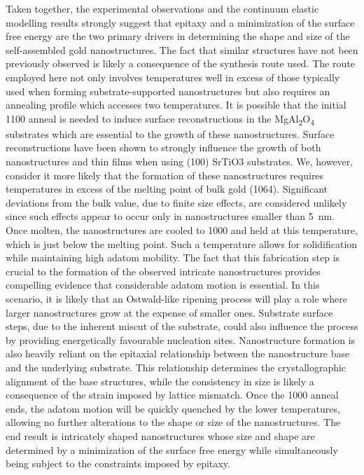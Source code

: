 Taken together, the experimental observations and the continuum elastic modelling results strongly suggest that epitaxy and a minimization of the surface free energy are the two primary drivers in determining the shape and size of the self-assembled gold nanostructures.
The fact that similar structures have not been previously observed is likely a consequence of the synthesis route used.
The route employed here not only involves temperatures well in excess of those typically used when forming substrate-supported nanostructures but also requires an annealing profile which accesses two temperatures.
It is possible that the initial 1100\celsius{} anneal is needed to induce surface reconstructions in the MgAl\textsubscript{2}O\textsubscript{4} substrates which are essential to the growth of these nanostructures.
Surface reconstructions have been shown to strongly influence the growth of both nanostructures\cite{RefWorks:24,RefWorks:16,RefWorks:104} and thin films\cite{Neretina2009a} when using (100) SrTiO3 substrates.
We, however, consider it more likely that the formation of these nanostructures requires temperatures in excess of the melting point of bulk gold (1064\celsius{}).
Significant deviations from the bulk value, due to finite size effects, are considered unlikely since such effects appear to occur only in nanostructures smaller than 5~nm\cite{RefWorks:43}.
Once molten, the nanostructures are cooled to 1000\celsius{} and held at this temperature, which is just below the melting point.
Such a temperature allows for solidification while maintaining high adatom mobility.
The fact that this fabrication step is crucial to the formation of the observed intricate nanostructures provides compelling evidence that considerable adatom motion is essential.
In this scenario, it is likely that an Ostwald-like ripening process will play a role where larger nanostructures grow at the expense of smaller ones.
Substrate surface steps, due to the inherent miscut of the substrate\cite{RefWorks:69}, could also influence the process by providing energetically favourable nucleation sites.
Nanostructure formation is also heavily reliant on the epitaxial relationship between the nanostructure base and the underlying substrate.
This relationship determines the crystallographic alignment of the base structures, while the consistency in size is likely a consequence of the strain imposed by lattice mismatch.
Once the 1000\celsius{} anneal ends, the adatom motion will be quickly quenched by the lower temperatures, allowing no further alterations to the shape or size of the nanostructures.
The end result is intricately shaped nanostructures whose size and shape are determined by a minimization of the surface free energy while simultaneously being subject to the constraints imposed by epitaxy.
